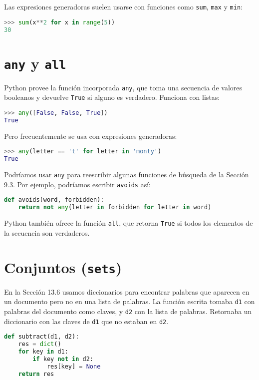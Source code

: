 Las expresiones generadoras suelen usarse con funciones como \texttt{sum}, \texttt{max} y \texttt{min}:

\begin{lstlisting}[language=Python]
>>> sum(x**2 for x in range(5))
30
\end{lstlisting}

\section{\texttt{any} y \texttt{all}}

Python provee la función incorporada \texttt{any}, que toma una secuencia de valores booleanos y devuelve \texttt{True} si alguno es verdadero. Funciona con listas:

\begin{lstlisting}[language=Python]
>>> any([False, False, True])
True
\end{lstlisting}

Pero frecuentemente se usa con expresiones generadoras:

\begin{lstlisting}[language=Python]
>>> any(letter == 't' for letter in 'monty')
True
\end{lstlisting}

Podríamos usar \texttt{any} para reescribir algunas funciones de búsqueda de la Sección 9.3. Por ejemplo, podríamos escribir \texttt{avoids} así:

\begin{lstlisting}[language=Python]
def avoids(word, forbidden):
    return not any(letter in forbidden for letter in word)
\end{lstlisting}

Python también ofrece la función \texttt{all}, que retorna \texttt{True} si todos los elementos de la secuencia son verdaderos.

\section{Conjuntos (\texttt{sets})}

En la Sección 13.6 usamos diccionarios para encontrar palabras que aparecen en un documento pero no en una lista de palabras. La función escrita tomaba \texttt{d1} con palabras del documento como claves, y \texttt{d2} con la lista de palabras. Retornaba un diccionario con las claves de \texttt{d1} que no estaban en \texttt{d2}.

\begin{lstlisting}[language=Python]
def subtract(d1, d2):
    res = dict()
    for key in d1:
        if key not in d2:
            res[key] = None
    return res
\end{lstlisting}

